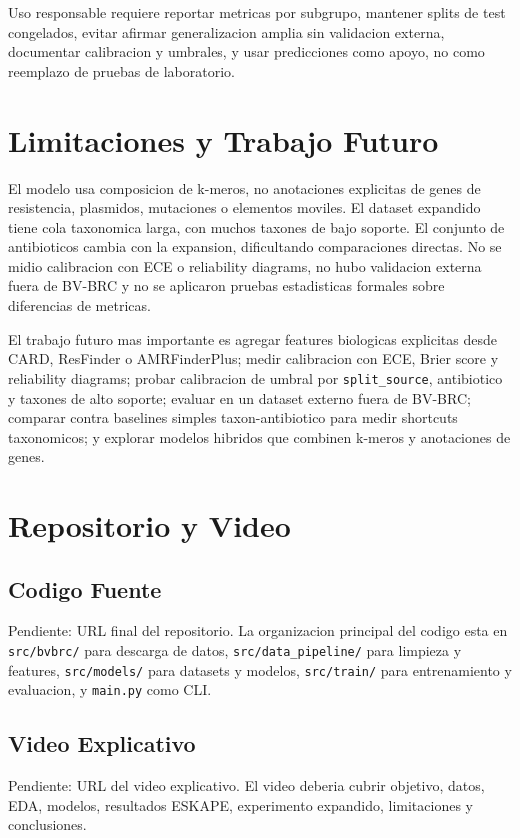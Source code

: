 \documentclass[journal,transmag]{../ieee_latex_template/IEEEtran}
\begin{document}
Uso responsable requiere reportar metricas por subgrupo, mantener splits de test congelados, evitar afirmar generalizacion amplia sin validacion externa, documentar calibracion y umbrales, y usar predicciones como apoyo, no como reemplazo de pruebas de laboratorio.

\section{Limitaciones y Trabajo Futuro}
El modelo usa composicion de k-meros, no anotaciones explicitas de genes de resistencia, plasmidos, mutaciones o elementos moviles. El dataset expandido tiene cola taxonomica larga, con muchos taxones de bajo soporte. El conjunto de antibioticos cambia con la expansion, dificultando comparaciones directas. No se midio calibracion con ECE o reliability diagrams, no hubo validacion externa fuera de BV-BRC y no se aplicaron pruebas estadisticas formales sobre diferencias de metricas.

El trabajo futuro mas importante es agregar features biologicas explicitas desde CARD, ResFinder o AMRFinderPlus; medir calibracion con ECE, Brier score y reliability diagrams; probar calibracion de umbral por \texttt{split\_source}, antibiotico y taxones de alto soporte; evaluar en un dataset externo fuera de BV-BRC; comparar contra baselines simples taxon-antibiotico para medir shortcuts taxonomicos; y explorar modelos hibridos que combinen k-meros y anotaciones de genes.

\section{Repositorio y Video}
\subsection{Codigo Fuente}
Pendiente: URL final del repositorio. La organizacion principal del codigo esta en \texttt{src/bvbrc/} para descarga de datos, \texttt{src/data\_pipeline/} para limpieza y features, \texttt{src/models/} para datasets y modelos, \texttt{src/train/} para entrenamiento y evaluacion, y \texttt{main.py} como CLI.

\subsection{Video Explicativo}
Pendiente: URL del video explicativo. El video deberia cubrir objetivo, datos, EDA, modelos, resultados ESKAPE, experimento expandido, limitaciones y conclusiones.
\end{document}
